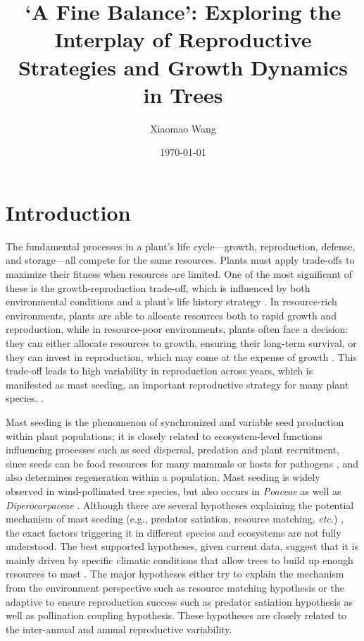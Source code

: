 \documentclass[11pt,letter]{article}
\begin{document}
\title{`A Fine Balance': Exploring the Interplay of Reproductive Strategies and Growth Dynamics in Trees}
\author{Xiaomao Wang} 
\date{\today}
\maketitle

\setlength{\parindent}{0pt}
\setlength{\parskip}{3pt}

\section{Introduction} 
The fundamental processes in a plant's life cycle—growth, reproduction, defense, and storage—all compete for the same resources. Plants must apply trade-offs to maximize their fitness when resources are limited. One of the most significant of these is the growth-reproduction trade-off, which is influenced by both environmental conditions and a plant's life history strategy \citep{stearns1998evolution}. In resource-rich environments, plants are able to allocate resources both to rapid growth and reproduction, while in resource-poor environments, plants often face a decision: they can either allocate resources to growth, ensuring their long-term survival, or they can invest in reproduction, which may come at the expense of growth \citep{bazzaz1997allocation}. This trade-off leads to high variability in reproduction across years, which is manifested as mast seeding, an important reproductive strategy for many plant species. \citep{pearse2016mechanisms}.\par
Mast seeding is the phenomenon of synchronized and variable seed production within plant populations; it is closely related to ecosystem-level functions influencing processes such as seed dispersal, predation and plant recruitment, since seeds can be food resources for many mammals or hosts for pathogens  \citep{janzen1971seed, kelly1994evolutionary, davies2024seed}, and also determines regeneration within a population. Mast seeding is widely observed in wind-pollinated tree species, but also occurs in \textit{Poaceae} as well as \textit{Diperocarpaceae} \citep{kelly2002mast}. Although there are several hypotheses explaining the potential mechanism of mast seeding (e.g., predator satiation, resource matching, \textit{etc.})  \citep{koenig2021brief}, the exact factors triggering it in different species and ecosystems are not fully understood. The best supported hypotheses, given current data, suggest that it is mainly driven by specific climatic conditions that allow trees to build up enough resources to mast  \citep{pearse2016mechanisms}. The major hypotheses either try to explain the mechanism from the environment perspective such as resource matching hypothesis or the adaptive to ensure reproduction success such as predator satiation hypothesis as well as pollination coupling hypothesis. These hypotheses are closely related to the inter-annual and annual reproductive variability.\par
\end{document}
